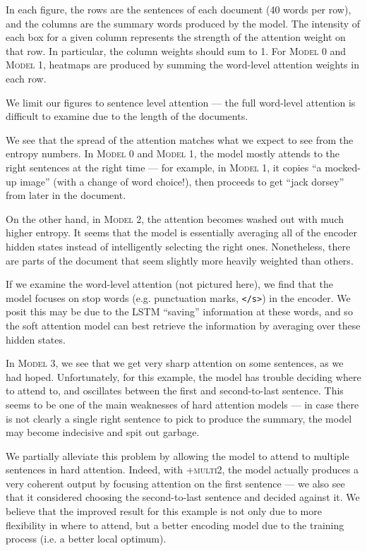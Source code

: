 \documentclass[12pt]{report}
\begin{document}
In each figure, the rows are the sentences of each document (40 words per row), and the columns are the summary words produced by the model. The intensity of each box for a given column represents the strength of the attention weight on that row. In particular, the column weights should sum to 1.
For \textsc{Model 0} and \textsc{Model 1}, heatmaps are produced by summing the word-level attention weights in each row.

We limit our figures to sentence level attention --- the full word-level attention is difficult to examine due to the length of the documents.

We see that the spread of the attention matches what we expect to see from the entropy numbers. In \textsc{Model 0} and \textsc{Model 1}, the model mostly attends to the right sentences at the right time --- for example, in \textsc{Model 1}, it copies ``a mocked-up image'' (with a change of word choice!), then proceeds to get ``jack dorsey'' from later in the document.

On the other hand, in \textsc{Model 2}, the attention becomes washed out with much higher entropy. It seems that the model is essentially averaging all of the encoder hidden states instead of intelligently selecting the right ones. Nonetheless, there are parts of the document that seem slightly more heavily weighted than others.

If we examine the word-level attention (not pictured here), we find that the model focuses on stop words (e.g. punctuation marks, \texttt{</s>}) in the encoder. We posit this may be due to the LSTM ``saving'' information at these words, and so the soft attention model can best retrieve the information by averaging over these hidden states.

In \textsc{Model 3}, we see that we get very sharp attention on some sentences, as we had hoped. Unfortunately, for this example, the model has trouble deciding where to attend to, and oscillates between the first and second-to-last sentence. This seems to be one of the main weaknesses of hard attention models --- in case there is not clearly a single right sentence to pick to produce the summary, the model may become indecisive and spit out garbage.

We partially alleviate this problem by allowing the model to attend to multiple sentences in hard attention. Indeed, with \textsc{+multi2}, the model actually produces a very coherent output by focusing attention on the first sentence --- we also see that it considered choosing the second-to-last sentence and decided against it.
We believe that the improved result for this example is not only due to more flexibility in where to attend, but a better encoding model due to the training process (i.e. a better local optimum).
\end{document}
